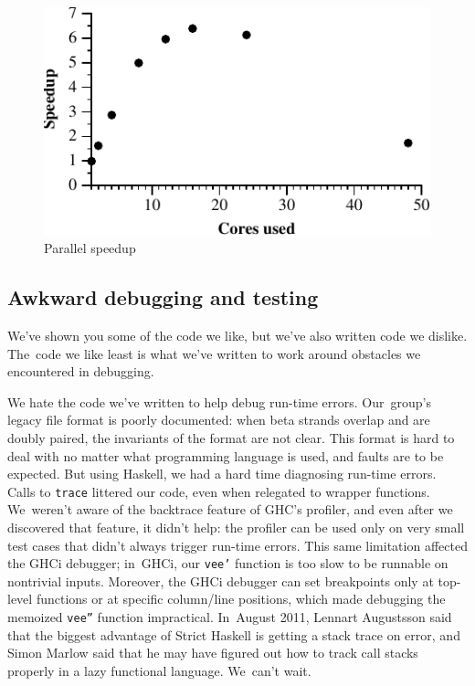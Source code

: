 \documentclass[preprint,nonatbib,blockstyle,times]{sigplanconf}
\newcommand\seclabel[1]{\label{sec:#1}}
\begin{document}
\begin{figure}%
\centerline{\includegraphics{speedup}}
\medskip
\caption{Parallel speedup}
\label{fig:speedup}
\end{figure}

%





\subsection{Awkward debugging and testing}

\seclabel{awkward-profiling}

We've shown you some of the code we like, but we've also written 
code we dislike.
The~code we like least is what we've written to work around
obstacles we 
encountered in debugging.

We hate the code we've written to help debug
run-time errors.
Our~group's legacy file
format is poorly documented: when beta
strands overlap and are doubly paired, the invariants of the
format are not clear.
This format is hard to deal with no matter what
programming language is used, and faults are to be expected.
But using Haskell, we had a hard time diagnosing run-time errors.
Calls to
\texttt{trace} 
littered our code,
even when relegated to wrapper functions.
We~weren't aware of the backtrace feature of GHC's profiler,
and even after we discovered that feature, it didn't help:
the profiler can be used only on very small test cases that didn't always trigger
run-time errors.
This same limitation affected the GHCi debugger; 
in~GHCi, our \texttt{vee'} function
is too slow to be runnable on nontrivial
inputs.
Moreover, the GHCi debugger can set breakpoints only at top-level functions
or at specific column/line positions, which made debugging the memoized
\texttt{vee''} function impractical.
In~August 2011, 
Lennart Augustsson said that the biggest advantage of Strict
Haskell is getting a stack trace on error,
and Simon Marlow said that he may have figured out how to track call
stacks properly in a lazy functional language.
We~can't wait.
\end{document}
